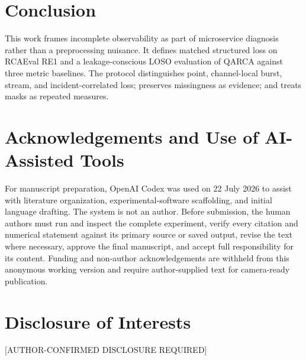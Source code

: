 \documentclass[runningheads]{llncs}
\newif\ifanonymous
\newcommand{\intereststatement}{[AUTHOR-CONFIRMED DISCLOSURE REQUIRED]}
\begin{document}
\section{Conclusion}

This work frames incomplete observability as part of microservice diagnosis
rather than a preprocessing nuisance. It defines matched structured loss on
RCAEval RE1 and a leakage-conscious LOSO evaluation of QARCA against three
metric baselines. The protocol distinguishes point, channel-local burst, stream, and
incident-correlated loss; preserves missingness as evidence; and treats masks
as repeated measures.


\section*{Acknowledgements and Use of AI-Assisted Tools}

For manuscript preparation, OpenAI Codex was used on 22 July 2026 to assist
with literature organization, experimental-software scaffolding, and initial
language drafting. The system is not an author. Before submission, the human
authors must run and inspect the complete experiment, verify every citation and
numerical statement against its primary source or saved output, revise the text
where necessary, approve the final manuscript, and accept full responsibility
for its content. Funding and non-author acknowledgements are withheld from this
anonymous working version and require author-supplied text for camera-ready
publication.

\section*{Disclosure of Interests}

\ifanonymous
The authors' declaration has not yet been provided to the drafting system. A
complete author-confirmed disclosure must replace this sentence before
submission or be supplied in the venue-approved anonymous form. This statement
must not be interpreted as a declaration that no competing interests exist.
\else
\intereststatement
\fi



\end{document}
